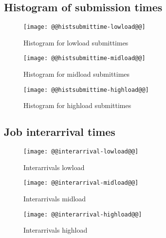 \documentclass[11pt]{article}
\begin{document}
\subsection{Histogram of submission times}
\begin{figure}[htbp]
  \begin{center}
    \texttt{[image: @@histsubmittime-lowload@@]}
    \caption{Histogram for lowload submittimes}
    \label{fig:histsubmittime-lowload}
  \end{center}
\end{figure}
\begin{figure}[htbp]
  \begin{center}
    \texttt{[image: @@histsubmittime-midload@@]}
    \caption{Histogram for midload submittimes}
    \label{fig:histsubmittime-midload}
  \end{center}
\end{figure}
\begin{figure}[htbp]
  \begin{center}
    \texttt{[image: @@histsubmittime-highload@@]}
    \caption{Histogram for highload submittimes}
    \label{fig:histsubmittime-highload}
  \end{center}
\end{figure}

\newpage
\subsection{Job interarrival times}
\begin{figure}[htbp]
  \begin{center}
    \texttt{[image: @@interarrival-lowload@@]}
    \caption{Interarrivals lowload }
    \label{fig:interarrival-lowload}
  \end{center}
\end{figure}
\begin{figure}[htbp]
  \begin{center}
    \texttt{[image: @@interarrival-midload@@]}
    \caption{Interarrivals midload }
    \label{fig:interarrival-midload}
  \end{center}
\end{figure}
\begin{figure}[htbp]
  \begin{center}
    \texttt{[image: @@interarrival-highload@@]}
    \caption{Interarrivals highload }
    \label{fig:interarrival-highload}
  \end{center}
\end{figure}
\end{document}
